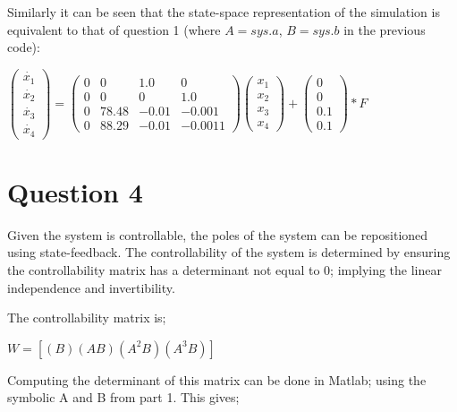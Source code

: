 \documentclass[12pt]{article}
\begin{document}
Similarly it can be seen that the state-space representation of the simulation is equivalent to that of question 1 (where $A = sys.a$, $B = sys.b$ in the previous code):


\vspace{\baselineskip}


$
\left(\begin{array}{c} \dot{x_{1}}\\ \dot{x_{2}}\\ \dot{x_{3}}\\ \dot{x_{4}} \end{array}\right)
 = 
 \left(\begin{array}{cccc} 0 & 0 & 1.0 & 0\\ 0 & 0 & 0 & 1.0\\ 0 & 78.48 & -0.01 & -0.001\\ 0 & 88.29 & -0.01 & -0.0011 \end{array}\right)
\left(\begin{array}{c} x_{1}\\ x_{2}\\ x_{3}\\ x_{4} \end{array}\right)
+
\left(\begin{array}{c} 0\\ 0\\ 0.1\\ 0.1 \end{array}\right)
*F$


\vspace{\baselineskip}



\section{Question 4}
Given the system is controllable, the poles of the system can be repositioned using state-feedback. The controllability of the system is determined by ensuring the controllability matrix has a determinant not equal to 0; implying the linear independence and invertibility.

The controllability matrix is;


\vspace{\baselineskip}


$ W = [ (B) (A B) (A^2 B) (A^3 B)]$


\vspace{\baselineskip}

Computing the determinant of this matrix can be done in Matlab; using the symbolic A 
and B from part 1. This gives;
\end{document}
